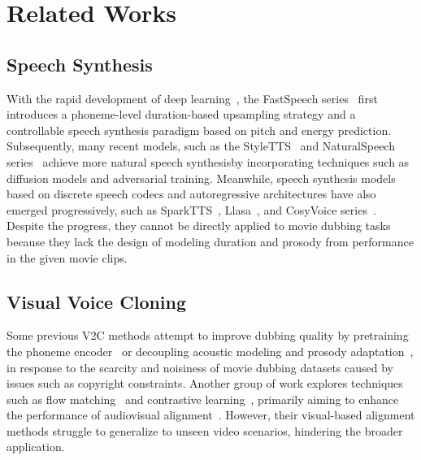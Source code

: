 \section{Related Works}

\subsection{Speech Synthesis} 
With the rapid development of deep learning~\cite{DeT, zhao2025heterogeneous, yin2025progressive, chen2024sdpl,zhang2024inductive,tu2024smart, li2022long, zhang2025generating}, the FastSpeech series~\cite{fs2} first introduces a phoneme-level duration-based upsampling strategy and a controllable speech synthesis paradigm based on pitch and energy prediction.
Subsequently, many recent models, such as the StyleTTS~\cite{StyleTTS2} and NaturalSpeech series~\cite{naturalspeech3} achieve more natural speech synthesisby incorporating techniques such as diffusion models and adversarial training.
Meanwhile, speech synthesis models based on discrete speech codecs and autoregressive architectures have also emerged progressively, such as SparkTTS~\cite{sparktts}, Llasa~\cite{llasa}, and CosyVoice series~\cite{cosyvoice3}.
Despite the progress, they cannot be directly applied to movie dubbing tasks because they lack the design of modeling duration and prosody from performance in the given movie clips.

\subsection{Visual Voice Cloning} 
Some previous V2C methods attempt to improve dubbing quality by pretraining the phoneme encoder~\cite{spk2dub} or decoupling acoustic modeling and prosody adaptation~\cite{ProDubber}, in response to the scarcity and noisiness of movie dubbing datasets caused by issues such as copyright constraints.
Another group of work explores techniques such as flow matching~\cite{emodubber} and contrastive learning~\cite{styledubber}, primarily aiming to enhance the performance of audiovisual alignment~\cite{HPMDubbing, zhao2025towards, cong2025flowdubber, li2025dubbing}.
However, their visual-based alignment methods struggle to generalize to unseen video scenarios, hindering the broader application.

